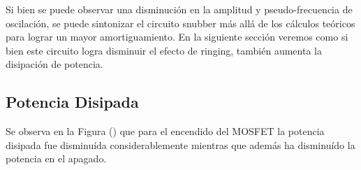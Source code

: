 Si bien se puede observar una disminución en la amplitud y pseudo-frecuencia de oscilación, se puede sintonizar el circuito snubber más allá de los cálculos teóricos para lograr un mayor amortiguamiento. En la siguiente sección veremos como si bien este circuito logra disminuir el efecto de ringing, también aumenta la disipación de potencia.

\subsection{Potencia Disipada}

Se observa en la Figura () que para el encendido del MOSFET la potencia disipada fue disminuída considerablemente mientras que además ha disminuído la potencia en el apagado. 

